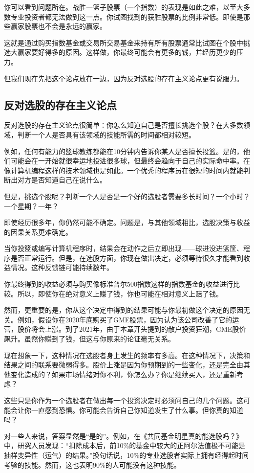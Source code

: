 你可以看到问题所在。战胜一篮子股票（一个指数）的表现是如此之难，以至大多数专业投资者都无法做到这一点。你试图找到的获胜股票的比例非常低。即使是那些赢家股票也不会是永远的赢家。

这就是通过购买指数基金或交易所交易基金来持有所有股票通常比试图在个股中挑选大赢家要好得多的原因。这样做，你最终可能会有更多的钱，并经历更少的压力。

但我们现在先把这个论点放在一边，因为反对选股的存在主义论点更有说服力。

\subsection{反对选股的存在主义论点}
反对选股的存在主义论点很简单：你怎么知道自己是否擅长挑选个股？在大多数领域，判断一个人是否具有该领域的技能所需的时间都相对较短。

例如，任何有能力的篮球教练都能在10分钟内告诉你某人是否擅长投篮。是的，他们可能会在一开始就很幸运地投进很多球，但最终会趋向于自己的实际命中率。在像计算机编程这样的技术领域也是如此。一个优秀的程序员在很短的时间内就能判断出对方是否知道自己在说什么。

但是，挑选个股呢？判断一个人是否是一个好的选股者需要多长时间？一个小时？一个星期？一年？

即使经历很多年，你仍然可能不确定。问题是，与其他领域相比，选股决策与收益的因果关系更难确定。

当你投篮或编写计算机程序时，结果会在动作之后立即出现——球进没进篮筐、程序是否正常运行。但是，在选股方面，你现在做出决定，必须等待很久才能看到收益情况。这种反馈链可能持续数年。

你最终得到的收益必须与购买像标准普尔500指数这样的指数基金的收益进行比较。所以，即使你在绝对意义上赚了钱，你也可能在相对意义上赔了钱。

然而，更重要的是，你从这个决定中得到的结果可能与你最初做这个决定的原因无关。例如，假设你在2020年底购买了GME股票，因为认为该公司改善了它的运营，股价将会上涨。到了2021年，由于本章开头提到的散户投资狂潮，GME股价飙升。虽然你赚到了钱，但这与你原来的论证毫无关系。

现在想象一下，这种情况在选股者身上发生的频率有多高。在这种情况下，决策和结果之间的联系要微弱得多。股价上涨是因为你预期到的一些变化，还是完全由其他变化造成的？如果市场情绪对你不利，你怎么办？你是继续买入，还是重新考虑？

这些只是你作为一个选股者在做出每一个投资决定时必须问自己的几个问题。这可能会让你一直感到恐惧。你可能会告诉自己你知道发生了什么事。但你真的知道吗？

对一些人来说，答案显然是“是的”。例如，在《共同基金明星真的能选股吗？》中，研究人员发现：“扣除成本后，前10\%的基金中较大的正阿尔法值极不可能是抽样变异性（运气）的结果。”换句话说，10\%的专业选股者实际上拥有经得起时间考验的技能。然而，这也表明90\%的人可能没有这种技能。


